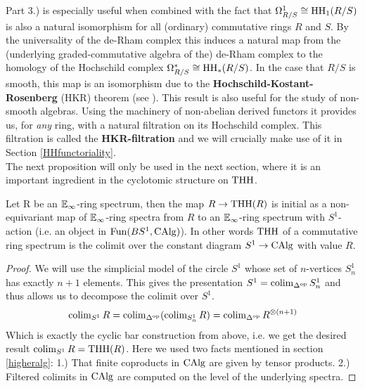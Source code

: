 Part 3.) is especially useful when combined with the fact that $ \Omega^1_{R/S} \cong \operatorname{HH}_1(R/S)$ is also a natural isomorphism for all (ordinary) commutative rings $R$ and $S$. By the universality of the de-Rham complex this induces a natural map from the (underlying graded-commutative algebra of the) de-Rham complex to the homology of the Hochschild complex $\Omega^{*}_{R/S} \cong \operatorname{HH}_*(R/S)$. 
In the case that $R/S$ is smooth, this map is an isomorphism due to the \textbf{Hochschild-Kostant-Rosenberg} (HKR) theorem (see \cite[Section~3.4]{loday2013cyclic}). 
This result is also useful for the study of non-smooth algebras. Using the machinery of non-abelian derived functors it provides us, for \textit{any} ring, with a natural filtration on its Hochschild complex. This filtration is called the \textbf{HKR-filtration} and we will crucially make use of it in Section \ref{HHfunctoriality}.
\\
The next proposition will only be used in the next section, where it is an important ingredient in the cyclotomic structure on $\operatorname{THH}$.
\begin{prop}\cite{mcclureschwaenzlvogt}
\label{McClureSchwaenzlVogt}
Let R be an $\mathbb{E}_\infty$-ring spectrum, then the map $R\rightarrow \operatorname{THH}(R)$ is initial as a non-equivariant map of $\mathbb{E}_\infty$-ring spectra from $R$ to an $\mathbb{E}_\infty$-ring spectrum with $S^1$-action (i.e. an object in $\operatorname{Fun}(BS^1,\operatorname{CAlg})$). In other words $\operatorname{THH}$ of a commutative ring spectrum is the colimit over the constant diagram $S^1\rightarrow \operatorname{CAlg}$ with value $R$.
\end{prop}
\begin{proof}
    We will use the simplicial model of the circle $S^1$ whose set of $n$-vertices $S_n^1$ has exactly $n+1$ elements. This gives the presentation $S^1=\operatorname{colim}_{\Delta^{\operatorname{op}}}S_n^1$ and thus allows us to decompose the colimit over $S^1$.
    \begin{equation*}
        \operatorname{colim}_{S^1}R=\operatorname{colim}_{\Delta^{\operatorname{op}}}(\operatorname{colim}_{S_n^1}R)=\operatorname{colim}_{\Delta^{\operatorname{op}}}R^{\otimes(n+1)}
    \end{equation*} 
    Which is exactly the cyclic bar construction from above, i.e. we get the desired result $\operatorname{colim}_{S^1}R=\operatorname{THH}(R)$. Here we used two facts mentioned in section \ref{higheralg}: 1.) That finite coproducts in $\operatorname{CAlg}$ are given by tensor products. 2.) Filtered colimits in $\operatorname{CAlg}$ are computed on the level of the underlying spectra.
\end{proof}
